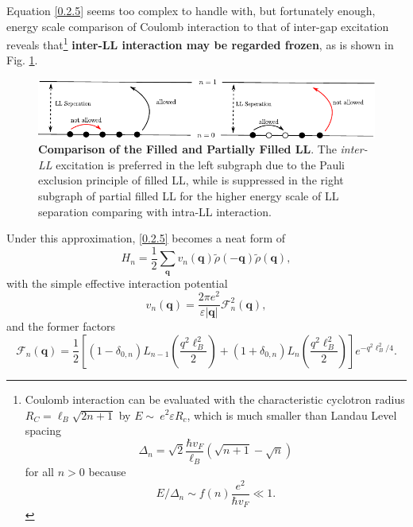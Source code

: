 \documentclass[bachelor,english,numbers]{ustcthesis}
\begin{document}
			Equation \eqref{0.2.5} seems too complex to handle with, but fortunately enough, energy scale comparison of Coulomb interaction to that of inter-gap excitation reveals that\footnote{Coulomb interaction can be evaluated with the characteristic cyclotron radius $R_C=\ell_B\sqrt{2n+1}$ by $E\sim\ e^2\varepsilon R_c$, which is much smaller than Landau Level spacing
			\begin{equation*}
				\Delta_n=\sqrt{2}\dfrac{\hbar v_F}{\ell_B}(\sqrt{n+1}-\sqrt{n})
			\end{equation*}
			for all $n>0$ because
			\begin{equation*}
				E/\Delta_n\sim f(n)\dfrac{e^2}{\hbar v_F}\ll1.
			\end{equation*}} {\bf inter-LL interaction may be regarded frozen}, as is shown in Fig. \ref{fig:1}.\par
			\begin{figure}[!htp]
				\centering
				\includegraphics[scale=1.1]{LL.pdf}
				\caption{{\bf Comparison of the Filled and Partially Filled LL}. The \emph{inter-LL} excitation is preferred in the left subgraph due to the Pauli exclusion principle of filled LL, while is suppressed in the right subgraph of partial filled LL for the higher energy scale of LL separation comparing with intra-LL interaction.}
				\label{fig:1}
			\end{figure}
			Under this approximation, \eqref{0.2.5} becomes a neat form of \cite{nomura2006quantum,goerbig2006electron}
			\begin{equation}\label{0.2.6}
				H_n=\dfrac{1}{2}\sum_{\bm{q}}v_n(\bm{q})\widetilde{\rho}(\bm{-q})\widetilde{\rho}(\bm{q}),  
			\end{equation}
			with the simple effective interaction potential
			\begin{equation*}
				v_n(\bm{q})=\dfrac{2\pi e^2}{\varepsilon|\bm{q}|}\mathcal{F}_n^2(\bm{q}),
			\end{equation*}
			and the former factors \cite{apalkov2006fractional}
			\begin{equation*}
				\mathcal{F}_n(\bm{q})=\dfrac{1}{2}\left[(1-\delta_{0,n})L_{n-1}\left(\dfrac{q^2\ell_B^2}{2}\right)+(1+\delta_{0,n})L_{n}\left(\dfrac{q^2\ell_B^2}{2}\right)\right]e^{-q^2\ell_B^2/4}.
			\end{equation*}
\end{document}
